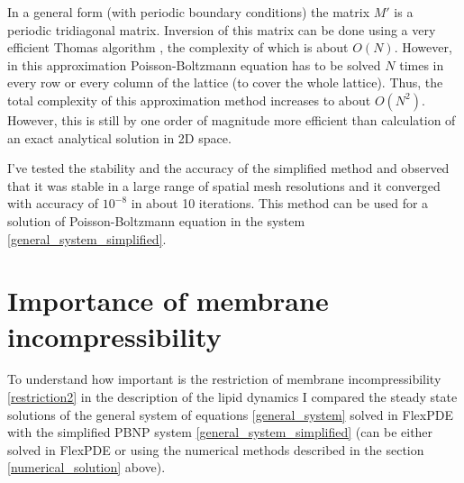In a general form (with periodic boundary conditions) the matrix $M'$ is a periodic tridiagonal matrix. Inversion of this matrix can be done using a very efficient Thomas algorithm \cite{Conte1980}, the complexity of which is about $O(N)$. However, in this approximation Poisson-Boltzmann equation has to be solved $N$ times in every row or every column of the lattice (to cover the whole lattice). Thus, the total complexity of this approximation method increases to about $O(N^2)$. However, this is still by one order of magnitude more efficient than calculation of an exact analytical solution in 2D space.

I've tested the stability and the accuracy of the simplified method and observed that it was stable in a large range of spatial mesh resolutions and it converged with accuracy of $10^{-8}$ in about 10 iterations. This method can be used for a solution of Poisson-Boltzmann equation in the system \eqref{general_system_simplified}.

\section{Importance of membrane incompressibility}

To understand how important is the restriction of membrane incompressibility \eqref{restriction2} in the description of the lipid dynamics I compared the steady state solutions of the general system of equations \eqref{general_system} solved in FlexPDE with the simplified PBNP system \eqref{general_system_simplified} (can be either solved in FlexPDE or using the numerical methods described in the section \ref{numerical_solution} above).

